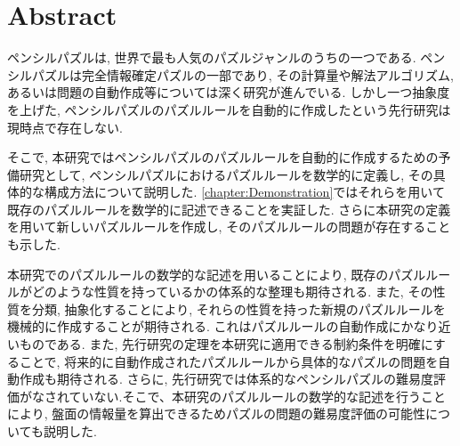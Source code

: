 \chapter*{{\rm \bf Abstract}}\label{chapter:Abstract}
ペンシルパズルは, 世界で最も人気のパズルジャンルのうちの一つである. ペンシルパズルは完全情報確定パズルの一部であり, その計算量や解法アルゴリズム, あるいは問題の自動作成等については深く研究が進んでいる. しかし一つ抽象度を上げた, ペンシルパズルのパズルルールを自動的に作成したという先行研究は現時点で存在しない.

そこで, 本研究ではペンシルパズルのパズルルールを自動的に作成するための予備研究として, ペンシルパズルにおけるパズルルールを数学的に定義し, その具体的な構成方法について説明した. \cref{chapter:Demonstration}ではそれらを用いて既存のパズルルールを数学的に記述できることを実証した. さらに本研究の定義を用いて新しいパズルルールを作成し, そのパズルルールの問題が存在することも示した.

本研究でのパズルルールの数学的な記述を用いることにより, 既存のパズルルールがどのような性質を持っているかの体系的な整理も期待される. また, その性質を分類, 抽象化することにより, それらの性質を持った新規のパズルルールを機械的に作成することが期待される. これはパズルルールの自動作成にかなり近いものである. また, 先行研究の定理を本研究に適用できる制約条件を明確にすることで, 将来的に自動作成されたパズルルールから具体的なパズルの問題を自動作成も期待される. さらに, 先行研究では体系的なペンシルパズルの難易度評価がなされていない.そこで、本研究のパズルルールの数学的な記述を行うことにより, 盤面の情報量を算出できるためパズルの問題の難易度評価の可能性についても説明した.